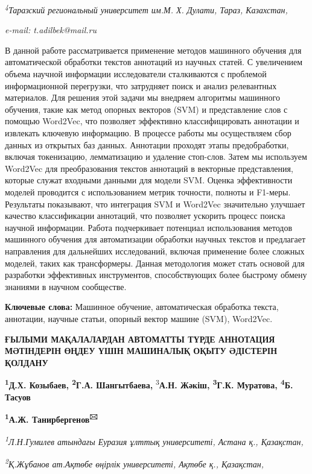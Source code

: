 \documentclass[
]{article}
\begin{document}
\emph{\textsuperscript{4}Таразский региональный университет им.М. Х.
Дулати, Тараз, Казахстан,}

\emph{e-mail: t.adilbek@mail.ru}

В данной работе рассматривается применение методов машинного обучения
для автоматической обработки текстов аннотаций из научных статей. С
увеличением объема научной информации исследователи сталкиваются с
проблемой информационной перегрузки, что затрудняет поиск и анализ
релевантных материалов. Для решения этой задачи мы внедряем алгоритмы
машинного обучения, такие как метод опорных векторов (SVM) и
представление слов с помощью Word2Vec, что позволяет эффективно
классифицировать аннотации и извлекать ключевую информацию. В процессе
работы мы осуществляем сбор данных из открытых баз данных. Аннотации
проходят этапы предобработки, включая токенизацию, лемматизацию и
удаление стоп-слов. Затем мы используем Word2Vec для преобразования
текстов аннотаций в векторные представления, которые служат входными
данными для модели SVM. Оценка эффективности моделей проводится с
использованием метрик точности, полноты и F1-меры. Результаты
показывают, что интеграция SVM и Word2Vec значительно улучшает качество
классификации аннотаций, что позволяет ускорить процесс поиска научной
информации. Работа подчеркивает потенциал использования методов
машинного обучения для автоматизации обработки научных текстов и
предлагает направления для дальнейших исследований, включая применение
более сложных моделей, таких как трансформеры. Данная методология может
стать основой для разработки эффективных инструментов, способствующих
более быстрому обмену знаниями в научном сообществе.

\textbf{Ключевые слова:} Машинное обучение, автоматическая обработка
текста, аннотации, научные статьи, опорный вектор машине (SVM),
Word2Vec.

\textbf{ҒЫЛЫМИ МАҚАЛАЛАРДАН АВТОМАТТЫ ТҮРДЕ АННОТАЦИЯ МӘТІНДЕРІН ӨҢДЕУ
ҮШІН МАШИНАЛЫҚ ОҚЫТУ ӘДІСТЕРІН ҚОЛДАНУ}

\textbf{\textsuperscript{1}Д.Х. Козыбаев, \textsuperscript{2}Г.А.
Шангытбаева,} \textsuperscript{3}\textbf{А.Н. Жәкіш,
\textsuperscript{3}Г.К. Муратова, \textsuperscript{4}Б. Тасуов}

\textbf{\textsuperscript{1}А.Ж. Танирбергенов\textsuperscript{🖂}}

\emph{\textsuperscript{1}Л.Н.Гумилев атындағы Еуразия ұлттық
университеті, Астана қ., Қазақстан,}

\emph{\textsuperscript{2}Қ.Жұбанов ат.Ақтөбе өңірлік университеті,
Ақтөбе қ., Қазақстан,}
\end{document}
